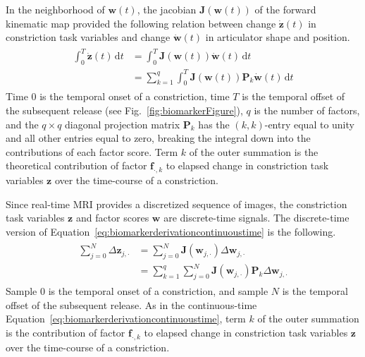 \documentclass[preprint]{JASAnew}\usepackage[]{graphicx}\usepackage[]{color}
\begin{document}
In the neighborhood of $\mathbf{w}(t)$, the jacobian $\mathbf{J}(\mathbf{w}(t))$ of the forward kinematic map provided the following relation between change $\mathbf{\dot{z}}(t)$ in constriction task variables and change $\mathbf{\dot{w}}(t)$ in articulator shape and position.
%
\begin{align}
\label{eq:biomarkerderivationcontinuoustime}
\begin{split}
\int_{0}^{T} \mathbf{\dot{z}}(t) \, \mathrm{d}t
	&= \int_{0}^{T} \mathbf{J}\left( \mathbf{w}(t) \right) \mathbf{\dot{w}}(t) \, \mathrm{d}t \\
    &= \sum_{k=1}^q \int_{0}^{T} \mathbf{J}\left( \mathbf{w}(t) \right) \mathbf{P}_k \mathbf{\dot{w}}(t) \, \mathrm{d}t
\end{split}
\end{align}
%
Time $0$ is the temporal onset of a constriction, time $T$ is the temporal offset of the subsequent release (see Fig.~\ref{fig:biomarkerFigure}), $q$ is the number of factors, and the $q\times q$ diagonal projection matrix $\mathbf{P}_k$ has the $(k,k)$-entry equal to unity and all other entries equal to zero, breaking the integral down into the contributions of each factor score.
Term $k$ of the outer summation is the theoretical contribution of factor $\mathbf{f}_{\cdot,k}$ to elapsed change in constriction task variables $\mathbf{z}$ over the time-course of a constriction. 

Since real-time MRI provides a discretized sequence of images, the constriction task variables $\mathbf{z}$ and factor scores $\mathbf{w}$ are discrete-time signals. 
%
The discrete-time version of Equation~\ref{eq:biomarkerderivationcontinuoustime} is the following.
%
\begin{align}
\label{eq:discretetimedeltaz}
\begin{split}
\sum_{j=0}^{N} \Delta \mathbf{z}_{j,\cdot}
	&= \sum_{j=0}^{N} \mathbf{J}\left( \mathbf{w}_{j,\cdot} \right) \Delta \mathbf{w}_{j,\cdot} \\
    &= \sum_{k=1}^q \sum_{j=0}^{N} \mathbf{J}\left( \mathbf{w}_{j,\cdot} \right) \mathbf{P}_k \Delta \mathbf{w}_{j,\cdot}
\end{split}
\end{align}
%
Sample $0$ is the temporal onset of a constriction, and sample $N$ is the temporal offset of the subsequent release.
%
As in the continuous-time Equation~\ref{eq:biomarkerderivationcontinuoustime}, term $k$ of the outer summation is the contribution of factor $\mathbf{f}_{\cdot,k}$ to elapsed change in constriction task variables $\mathbf{z}$ over the time-course of a constriction.
\end{document}
